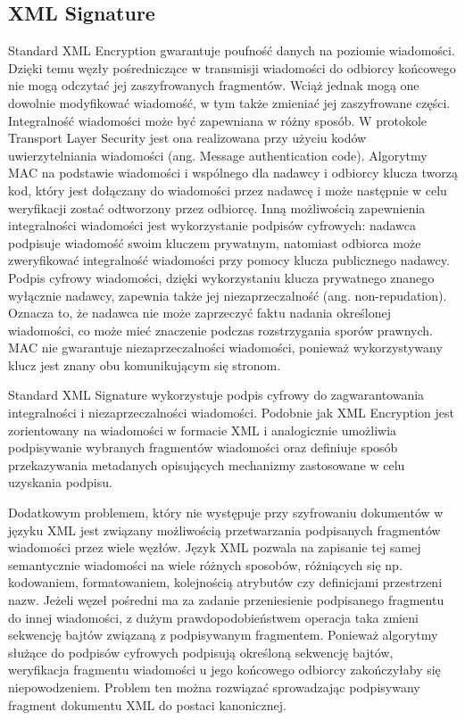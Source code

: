 \subsection{XML Signature}

Standard XML Encryption gwarantuje poufność danych na poziomie wiadomości. Dzięki temu węzły pośredniczące w transmisji wiadomości do odbiorcy końcowego nie mogą odczytać jej zaszyfrowanych fragmentów. Wciąż jednak mogą one dowolnie modyfikować wiadomość, w tym także zmieniać jej zaszyfrowane części. Integralność wiadomości może być zapewniana w różny sposób. W protokole Transport Layer Security jest ona realizowana przy użyciu kodów uwierzytelniania wiadomości (ang. Message authentication code). Algorytmy MAC na podstawie wiadomości i wspólnego dla nadawcy i odbiorcy klucza tworzą kod, który jest dołączany do wiadomości przez nadawcę i może następnie w celu weryfikacji zostać odtworzony przez odbiorcę. Inną możliwością zapewnienia integralności wiadomości jest wykorzystanie podpisów cyfrowych: nadawca podpisuje wiadomość swoim kluczem prywatnym, natomiast odbiorca może zweryfikować integralność wiadomości przy pomocy klucza publicznego nadawcy. Podpis cyfrowy wiadomości, dzięki wykorzystaniu klucza prywatnego znanego wyłącznie nadawcy, zapewnia także jej niezaprzeczalność (ang. non-repudation). Oznacza to, że nadawca nie może zaprzeczyć faktu nadania określonej wiadomości, co może mieć znaczenie podczas rozstrzygania sporów prawnych. MAC nie gwarantuje niezaprzeczalności wiadomości, ponieważ wykorzystywany klucz jest znany obu komunikującym się stronom.

Standard XML Signature wykorzystuje podpis cyfrowy do zagwarantowania integralności i niezaprzeczalności wiadomości. Podobnie jak XML Encryption jest zorientowany na wiadomości w formacie XML i analogicznie umożliwia podpisywanie wybranych fragmentów wiadomości oraz definiuje sposób przekazywania metadanych opisujących mechanizmy zastosowane w celu uzyskania podpisu.

Dodatkowym problemem, który nie występuje przy szyfrowaniu dokumentów w języku XML jest związany możliwością przetwarzania podpisanych fragmentów wiadomości przez wiele węzłów. Język XML pozwala na zapisanie tej samej semantycznie wiadomości na wiele różnych sposobów, różniących się np. kodowaniem, formatowaniem, kolejnością atrybutów czy definicjami przestrzeni nazw. Jeżeli węzeł pośredni ma za zadanie przeniesienie podpisanego fragmentu do innej wiadomości, z dużym prawdopodobieństwem operacja taka zmieni sekwencję bajtów związaną z podpisywanym fragmentem. Ponieważ algorytmy służące do podpisów cyfrowych podpisują określoną sekwencję bajtów, weryfikacja fragmentu wiadomości u jego końcowego odbiorcy zakończyłaby się niepowodzeniem. Problem ten można rozwiązać sprowadzając podpisywany fragment dokumentu XML do postaci kanonicznej. 

